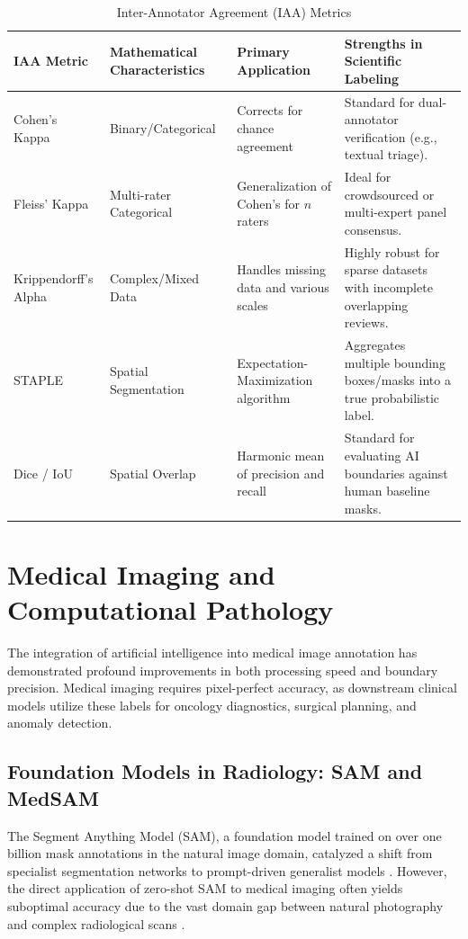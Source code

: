 \documentclass[conference]{IEEEtran}
\begin{document}
\begin{table}[ht]
\centering
\caption{Inter-Annotator Agreement (IAA) Metrics}
\label{tab:metrics}
\renewcommand{\arraystretch}{1.2}
\begin{tabularx}{\linewidth}{@{} l X X X @{}}
\toprule
\textbf{IAA Metric} & \textbf{Mathematical Characteristics} & \textbf{Primary Application} & \textbf{Strengths in Scientific Labeling} \\
\midrule
Cohen's Kappa & Binary/Categorical & Corrects for chance agreement & Standard for dual-annotator verification (e.g., textual triage). \\
Fleiss' Kappa & Multi-rater Categorical & Generalization of Cohen's for $n$ raters & Ideal for crowdsourced or multi-expert panel consensus. \\
Krippendorff's Alpha & Complex/Mixed Data & Handles missing data and various scales & Highly robust for sparse datasets with incomplete overlapping reviews. \\
STAPLE & Spatial Segmentation & Expectation-Maximization algorithm & Aggregates multiple bounding boxes/masks into a true probabilistic label. \\
Dice / IoU & Spatial Overlap & Harmonic mean of precision and recall & Standard for evaluating AI boundaries against human baseline masks. \\
\bottomrule
\end{tabularx}
\end{table}

\section{Medical Imaging and Computational Pathology}
The integration of artificial intelligence into medical image annotation has demonstrated profound improvements in both processing speed and boundary precision. Medical imaging requires pixel-perfect accuracy, as downstream clinical models utilize these labels for oncology diagnostics, surgical planning, and anomaly detection.

\subsection{Foundation Models in Radiology: SAM and MedSAM}
The Segment Anything Model (SAM), a foundation model trained on over one billion mask annotations in the natural image domain, catalyzed a shift from specialist segmentation networks to prompt-driven generalist models \cite{ref10}. However, the direct application of zero-shot SAM to medical imaging often yields suboptimal accuracy due to the vast domain gap between natural photography and complex radiological scans \cite{ref10}.
\end{document}
